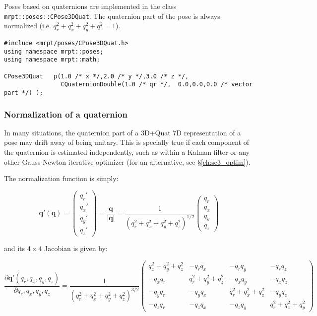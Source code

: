 \documentclass[a4paper,11pt]{report}
\begin{document}
Poses based on quaternions are implemented in the class \texttt{mrpt::poses::CPose3DQuat}.
The quaternion part of the pose is always normalized (i.e. $q_r^2+q_x^2+q_y^2+q_z^2=1$).

\begin{lstlisting}
#include <mrpt/poses/CPose3DQuat.h>
using namespace mrpt::poses;
using namespace mrpt::math;

CPose3DQuat   p(1.0 /* x */,2.0 /* y */,3.0 /* z */,
                CQuaternionDouble(1.0 /* qr */,  0.0,0.0,0.0 /* vector part */) );
\end{lstlisting}


\subsubsection{Normalization of a quaternion}
\label{sect:quat:norm}

In many situations, the quaternion part of a 3D+Quat 7D representation
of a pose may drift away of being unitary.
This is specially true if each component of the quaternion is estimated
independently, such as within a Kalman filter or
any other Gauss-Newton iterative optimizer
(for an alternative, see \S\ref{ch:se3_optim}).

The normalization function is simply:

\begin{equation}
\mathbf{q'}(\mathbf{q})
=
\left(
\begin{array}{c}
 q_r' \\ q_x'\\ q_y'\\ q_z'
\end{array}
\right)
=
\frac{\mathbf{q}}{|\mathbf{q}|}
=
\frac{1}{(q_r^2+q_x^2+q_y^2+q_z^2)^{1/2}}
\left(
\begin{array}{c}
 q_r \\ q_x\\ q_y\\ q_z
\end{array}
\right)
\end{equation}

\noindent and its $4 \times 4$ Jacobian is given by:

\begin{equation}
\frac{\partial \mathbf{q'}(q_r,q_x,q_y,q_z)}{\partial q_r,q_x,q_y,q_z}
=
\frac{1}{(q_r^2+q_x^2+q_y^2+q_z^2)^{3/2}}
\left(
\begin{array}{cccc}
q_x^2 +q_y^2+q_z^2  & -q_r q_x   & -q_r q_y  & -q_r q_z  \\
-q_x q_r & q_r^2 +q_y^2+q_z^2 & -q_x q_y & - q_x q_z \\
-q_y q_r & -q_y q_x &  q_r^2 +q_x^2 +q_z^2 & -q_y q_z \\
-q_z q_r  & -q_z q_x & -q_z q_y  &  q_r^2+q_x^2+q_y^2
\end{array}
\right)
\end{equation}
\end{document}
